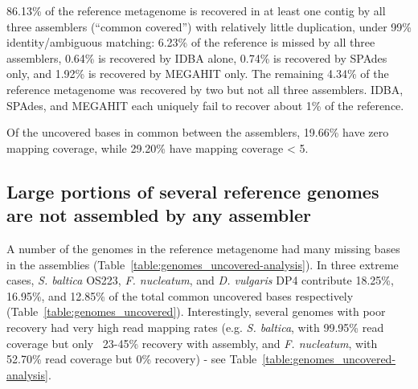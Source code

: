 \documentclass[10pt,a4paper,twocolumn]{article}
\begin{document}

86.13\% of the reference metagenome is recovered in at least one
contig by all three assemblers (``common covered'') with relatively
little duplication, under 99\% identity/ambiguous matching: 6.23\% of
the reference is missed by all three assemblers, 0.64\% is recovered
by IDBA alone, 0.74\% is recovered by SPAdes only, and 1.92\% is
recovered by MEGAHIT only.  The remaining 4.34\% of the reference
metagenome was recovered by two but not all three assemblers.
IDBA, SPAdes, and MEGAHIT each uniquely fail to recover about
1\% of the reference.


Of the uncovered bases in common between the assemblers, 19.66\% have
zero mapping coverage, while 29.20\% have mapping coverage \textless
5.


\subsection*{Large portions of several reference genomes are not assembled by any assembler}

A number of the genomes in the reference metagenome had many missing
bases in the assemblies (Table~\ref{table:genomes_uncovered-analysis}). In
three extreme cases, {\em S. baltica} OS223, {\em F.
nucleatum}, and {\em D. vulgaris} DP4 contribute 18.25\%, 16.95\%, and 12.85\%
of the total common uncovered bases respectively (Table~\ref{table:genomes_uncovered}).  Interestingly, several genomes with poor recovery had very high read mapping rates (e.g. {\em S. baltica}, with 99.95\% read coverage but only ~23-45\% recovery with assembly, and {\em F. nucleatum}, with 52.70\% read coverage but 0\% recovery) - see Table~\ref{table:genomes_uncovered-analysis}.
\end{document}
